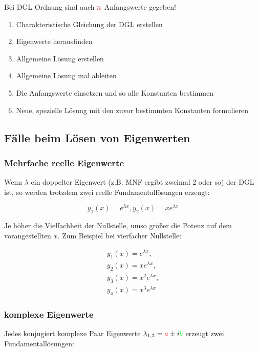 \documentclass[12pt, a4paper]{scrreprt}
\begin{document}
Bei DGL  Ordnung sind auch \(\mytextred{n}\) Anfangswerte gegeben!

\begin{enumerate}
\item Charakteristische Gleichung der DGL erstellen
\item Eigenwerte herausfinden
\item Allgemeine Lösung erstellen
\item Allgemeine Lösung  mal ableiten
\item Die Anfangswerte einsetzen und so alle Konstanten bestimmen
\item Neue, spezielle Lösung mit den zuvor bestimmten Konstanten formulieren
\end{enumerate}

\subsection{Fälle beim Lösen von Eigenwerten}

\subsubsection{Mehrfache reelle Eigenwerte}

Wenn \(\lambda\) ein doppelter Eigenwert (z.B. MNF ergibt zweimal 2 oder so) der DGL ist, so werden trotzdem zwei reelle Fundamentallösungen erzeugt:

\[
  y_1(x)=e^{\lambda x}, y_2(x)=xe^{\lambda x}
\]

Je höher die Vielfachheit der Nullstelle, umso größer die Potenz auf dem vorangestellten \(x\). Zum Beispiel bei vierfacher Nullstelle:

\[
  \begin{split}
    y_1(x)=e^{\lambda x},\\
    y_2(x)=xe^{\lambda x},\\
    y_3(x)=x^2e^{\lambda x},\\
    y_4(x)=x^3e^{\lambda x}
  \end{split}
\]

\subsubsection{komplexe Eigenwerte}

Jedes konjugiert komplexe Paar Eigenwerte \(\lambda_{1,2}=\textcolor{red}{a} \pm i\textcolor{green}{b}\) erzeugt zwei Fundamentallösungen:
\end{document}
